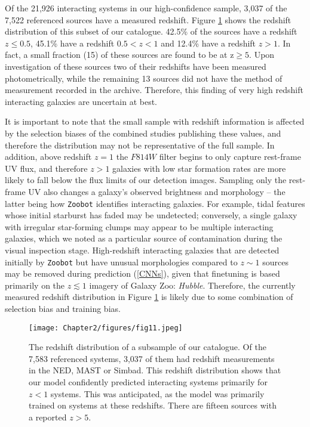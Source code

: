 {Of the 21,926 interacting systems in our high-confidence sample, 3,037 of the 7,522 referenced sources have a measured redshift. Figure \ref{fig:redshift-dist} shows the redshift distribution of this subset of our catalogue. 42.5\% of the sources have a redshift $z \leq 0.5$, 45.1\% have a redshift $0.5 < z < 1$ and 12.4\% have a redshift $z > 1$. In fact, a small fraction (15) of these sources are found to be at z$\geq 5$. Upon investigation of these sources two of their redshifts have been measured photometrically, while the remaining 13 sources did not have the method of measurement recorded in the archive. Therefore, this finding of very high redshift interacting galaxies are uncertain at best. 

It is important to note that the small sample with redshift information is affected by the selection biases of the combined studies publishing these values, and therefore the distribution may not be representative of the full sample. In addition, above redshift $z = 1$ the $F814W$ filter begins to only capture rest-frame UV flux, and therefore $z > 1$ galaxies with low star formation rates are more likely to fall below the flux limits of our detection images. Sampling only the rest-frame UV also changes a galaxy's observed brightness and morphology \citep[e.g.,][]{2022ApJ...938L...2F} -- the latter being how \texttt{Zoobot} identifies interacting galaxies. For example, tidal features whose initial starburst has faded may be undetected; conversely, a single galaxy with irregular star-forming clumps may appear to be multiple interacting galaxies, which we noted as a particular source of contamination during the visual inspection stage. High-redshift interacting galaxies that are detected initially by \texttt{Zoobot} but have unusual morphologies compared to $z \sim 1$ sources may be removed during prediction (\DIFdelbegin {}\DIFdelend \DIFaddbegin {}\DIFaddend \ref{CNNs}), given that finetuning is based primarily on the $z \lesssim 1$ imagery of Galaxy Zoo: \emph{Hubble}. Therefore, the currently measured redshift distribution in Figure \ref{fig:redshift-dist} is likely due to some combination of selection bias and training bias. 

\begin{figure}
  \centering
  \texttt{[image: Chapter2/figures/fig11.jpeg]}
  \caption[The redshift distribution of a subsample of our catalogue.]{The redshift distribution of a subsample of our catalogue. Of the 7,583 referenced systems, 3,037 of them had redshift measurements in the NED, MAST or Simbad. This redshift distribution shows that our model confidently predicted interacting systems primarily for $z < 1$ systems. This was anticipated, as the model was primarily trained on systems at these redshifts. There are fifteen sources with a reported $z > 5$.}
  \label{fig:redshift-dist}
\end{figure}

}
